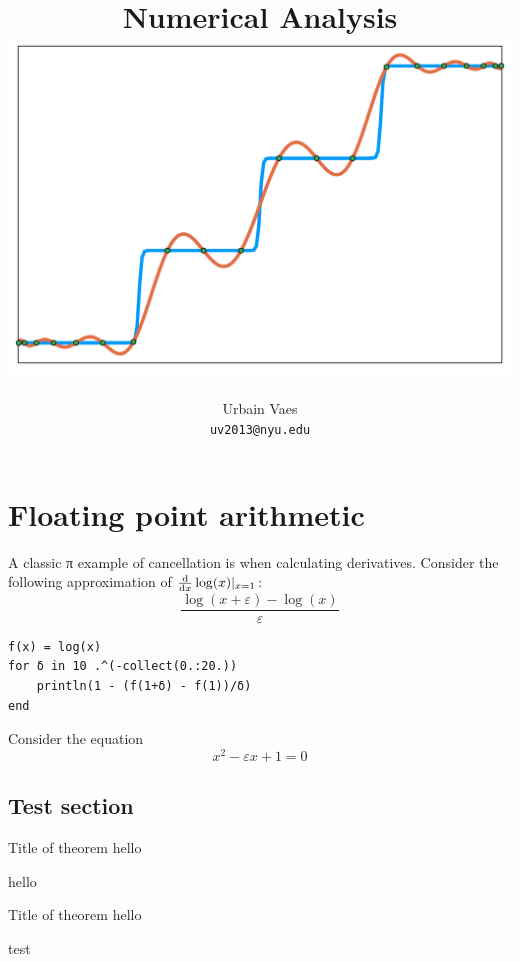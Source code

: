 \documentclass[11pt,a4paper]{report}
\title{\vspace{-1.5cm}\textbf{Numerical Analysis} \\[1cm]
    \includegraphics[width=.7\textwidth]{figures/chebychev_cover.pdf}
}
\author{%
    Urbain Vaes \\
    \texttt{uv2013@nyu.edu}
}
\date{\vspace{1cm} {\large\textsc{NYU Paris}, Spring term 2022} \\[2cm]
    \vfill
    \flushleft \textbf{Weekly schedule}:
    \begin{itemize}
        \item Lectures on Tuesday and Thursday afternoon (2 x 1h15);
        \item Recitation on Thursday afternoon (1h30);
        \item Office hour on Tuesday, after the lecture.
    \end{itemize}
}
\begin{document}
\maketitle



\tableofcontents

\chapter{Floating point arithmetic}%
\label{cha:rounding_errors}

\begin{example}
\end{example}

\begin{example}
    A classic π example of cancellation is when calculating derivatives.
    Consider the following approximation of $\frac{\mathrm d}{\mathrm d x}\log(x) \vert_{x=1}$:
    \[
        	\frac{\log(x + \varepsilon) - \log(x)}{\varepsilon}
    \]
\begin{verbatim}
f(x) = log(x)
for δ in 10 .^(-collect(0.:20.))
    println(1 - (f(1+δ) - f(1))/δ)
end
\end{verbatim}
\end{example}

\begin{example}
    Consider the equation
    \[
        x^2 - \varepsilon x + 1 = 0
    \]
\end{example}

\section{Test section}%
\label{sec:test_section}

\begin{theorem}
    {Title of theorem}
    \label{thm:test}
    hello
\end{theorem}

\begin{example}
    hello
\end{example}

\begin{lemma}
    {Title of theorem}
    \label{lemma:test}
    hello
\end{lemma}

\begin{remark}
    [Hello]
    test
\end{remark}
\end{document}
